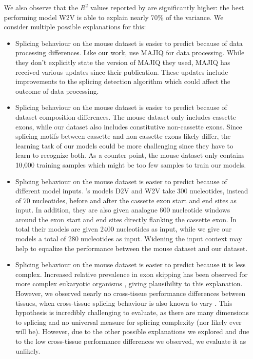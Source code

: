 We also observe that the $R^2$ values reported by \cite{d2vsplicing} are significantly higher: the best performing model W2V is able to explain nearly 70\% of the variance. We consider multiple possible explanations for this: 
\begin{itemize}
	\item Splicing behaviour on the mouse dataset is easier to predict because of data processing differences. Like our work, \cite{d2vsplicing} use MAJIQ for data processing. While they don't explicitly state the version of MAJIQ they used, MAJIQ has received various updates since their publication. These updates include improvements to the splicing detection algorithm which could affect the outcome of data processing. 
	\item Splicing behaviour on the mouse dataset is easier to predict because of dataset composition differences. The mouse dataset only includes cassette exons, while our dataset also includes constitutive non-cassette exons. Since splicing motifs between cassette and non-cassette exons likely differ, the learning task of our models could be more challenging since they have to learn to recognize both. As a counter point, the mouse dataset only contains 10,000 training samples which might be too few samples to train our models.

	

	\item Splicing behaviour on the mouse dataset is easier to predict because of different model inputs. \cite{d2vsplicing}'s models D2V and W2V take 300 nucleotides, instead of 70 nucleotides, before and after the cassette exon start and end sites as input. In addition, they are also given analogue 600 nucleotide windows around the exon start and end sites directly flanking the cassette exon. In total their models are given 2400 nucleotides as input, while we give our models a total of 280 nucleotides as input. Widening the input context may help to equalize the performance between the mouse dataset and our dataset. 
	\item Splicing behaviour on the mouse dataset is easier to predict because it is less complex. Increased relative prevalence in exon skipping has been observed for more complex eukaryotic organisms \cite{splicing_current_perspectives}, giving plausibility to this explanation. However, we observed nearly no cross-tissue performance differences between tissues, when cross-tissue splicing behaviour is also known to vary \cite{crosstissuesplicing}. This hypothesis is incredibly challenging to evaluate, as there are many dimensions to splicing and no universal measure for splicing complexity (nor likely ever will be). However, due to the other possible explanations we explored and due to the low cross-tissue performance differences we observed, we evaluate it as unlikely.
	
\end{itemize}

